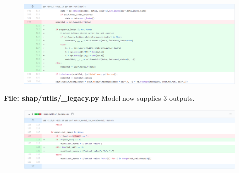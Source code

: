\documentclass[12pt]{article}
\begin{document}
\begin{figure}[H]
\includegraphics[scale=0.4]{diff/diff_9.png}
\end{figure}
\textbf{File: shap/utils/\_legacy.py}
Model now supplies 3 outputs. 
\begin{figure}[H]
\includegraphics[scale=0.4]{diff/diff_10.png}
\end{figure}
\end{document}
